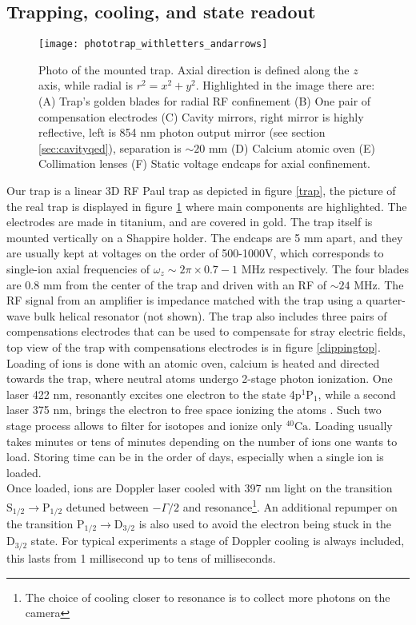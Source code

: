 \subsection{Trapping, cooling, and state readout}
\label{sec:expparameters}
\begin{figure}
\centering
\texttt{[image: phototrap\_withletters\_andarrows]}
\caption{Photo of the mounted trap. Axial direction is defined along the $z$ axis, while radial is $r^2 = x^2 + y^2$. Highlighted in the image there are: (A) Trap's golden blades for radial RF confinement (B) One pair of compensation electrodes (C) Cavity mirrors, right mirror is highly reflective, left is 854 nm photon output mirror (see section \ref{sec:cavityqed}), separation is $\sim 20$ mm (D) Calcium atomic oven (E) Collimation lenses (F) Static voltage endcaps for axial confinement.}
\label{trapphoto}
\end{figure}
Our trap is a linear 3D RF Paul trap as depicted in figure \ref{trap}, the picture of the real trap is displayed in figure \ref{trapphoto} where main components are highlighted. The electrodes are made in titanium, and are covered in gold. The trap itself is mounted vertically on a Shappire holder. The endcaps are 5 mm apart, and they are usually kept at voltages on the order of 500-1000V, which corresponds to single-ion axial frequencies of $\omega_z \sim 2\pi \times 0.7-1$ MHz respectively. The four blades are 0.8 mm from the center of the trap and driven with an RF of $\sim 24$ MHz. The RF signal from an amplifier is impedance matched with the trap using a quarter-wave bulk helical resonator (not shown). The trap also includes three pairs of compensations electrodes that can be used to compensate for stray electric fields, top view of the trap with compensations electrodes is in figure \ref{clippingtop}.
Loading of ions is done with an atomic oven, calcium is heated and directed towards the trap, where neutral atoms undergo 2-stage photon ionization. One laser 422 nm, resonantly excites one electron to the state 4p$^1\text{P}_1$, while a second laser 375 nm, brings the electron to free space ionizing the atoms \cite{Gulde2001}. Such two stage process allows to filter for isotopes and ionize only $^{40}\text{Ca}$. Loading usually takes minutes or tens of minutes depending on the number of ions one wants to load. Storing time can be in the order of days, especially when a single ion is loaded.\\
Once loaded, ions are Doppler laser cooled with 397 nm light on the transition $\text{S}_{1/2} \to \text{P}_{1/2}$ detuned between $-\Gamma/2$ and resonance\footnote{The choice of cooling closer to resonance is to collect more photons on the camera}. An additional repumper on the transition $\text{P}_{1/2} \to \text{D}_{3/2}$ is also used to avoid the electron being stuck in the $\text{D}_{3/2}$ state. For typical experiments a stage of Doppler cooling is always included, this lasts from 1 millisecond up to tens of milliseconds.\\
